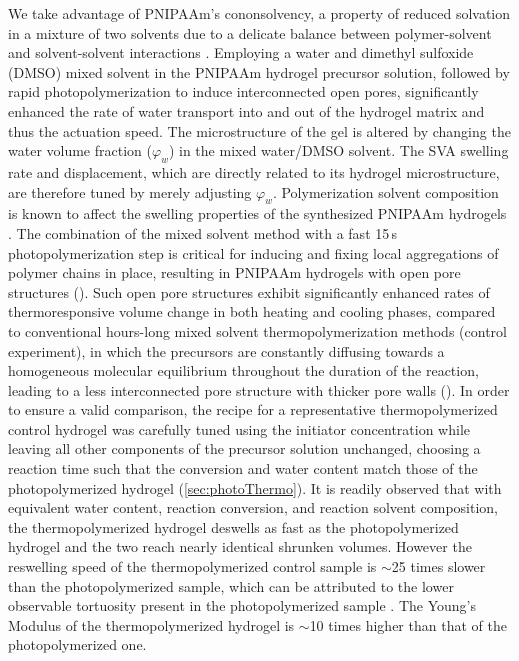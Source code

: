 We take advantage of PNIPAAm's cononsolvency, a property of reduced solvation in a mixture of two solvents due to a delicate balance between polymer-solvent and solvent-solvent interactions \cite{Pica2016}. Employing a water and dimethyl sulfoxide (DMSO) mixed solvent in the PNIPAAm hydrogel precursor solution, followed by rapid photopolymerization to induce interconnected open pores, significantly enhanced the rate of water transport into and out of the hydrogel matrix and thus the actuation speed. The microstructure of the gel is altered by changing the water volume fraction (\(\varphi_{w}\)) in the mixed water/DMSO solvent. The SVA swelling rate and displacement, which are directly related to its hydrogel microstructure, are therefore tuned by merely  adjusting \(\varphi_{w}\). Polymerization solvent composition is known to affect the swelling properties of the synthesized PNIPAAm hydrogels . 
The combination of the mixed solvent method with a fast 15\,s photopolymerization step is critical for inducing and fixing local aggregations of polymer chains in place,
resulting in PNIPAAm hydrogels with open pore structures (). Such open pore structures exhibit significantly enhanced rates of thermoresponsive volume change in both heating and cooling phases, compared to conventional hours-long mixed solvent thermopolymerization methods (control experiment), in which the precursors are constantly diffusing towards a homogeneous molecular equilibrium throughout the duration of the reaction, leading to a less interconnected pore structure with thicker pore walls ().
In order to ensure a valid comparison, the recipe for a representative thermopolymerized control hydrogel was carefully tuned using the initiator concentration while leaving all other components of the precursor solution unchanged, choosing a reaction time such that the conversion and water content match those of the photopolymerized hydrogel (\ref{sec:photoThermo}). It is readily observed that with equivalent water content, reaction conversion, and reaction solvent composition, the thermopolymerized hydrogel deswells as fast as the photopolymerized hydrogel  and the two reach nearly identical shrunken volumes. However the reswelling speed of the thermopolymerized control sample is $\sim$25 times slower than the photopolymerized sample, which can be attributed to the lower observable tortuosity present in the photopolymerized sample . The Young's Modulus of the thermopolymerized hydrogel is $\sim$10 times higher than that of the photopolymerized one. \\

